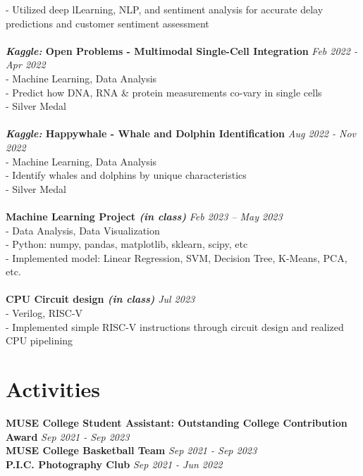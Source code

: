 \documentclass[a4paper,10pt]{article}
\begin{document}
- Utilized deep lLearning, NLP, and sentiment analysis for accurate delay predictions and customer sentiment assessment\\
\\
\textbf{\textit{Kaggle:} Open Problems - Multimodal Single-Cell Integration} \hfill \textit{Feb 2022 - Apr 2022}\\
- Machine Learning, Data Analysis\\
- Predict how DNA, RNA \& protein measurements co-vary in single cells\\
- Silver Medal\\
\\
\textbf{\textit{Kaggle:} Happywhale - Whale and Dolphin Identification} \hfill \textit{Aug 2022 - Nov 2022}\\
- Machine Learning, Data Analysis\\
- Identify whales and dolphins by unique characteristics\\
- Silver Medal\\
\\
\textbf{Machine Learning Project \textit{(in class)}} \hfill \textit{Feb 2023 -- May 2023}\\
- Data Analysis, Data Visualization\\
- Python: numpy, pandas, matplotlib, sklearn, scipy, etc\\
- Implemented model: Linear Regression, SVM, Decision Tree, K-Means, PCA, etc.\\
\\
\textbf{CPU Circuit design \textit{(in class)}} \hfill \textit{Jul 2023}\\
- Verilog, RISC-V\\
- Implemented simple RISC-V instructions through circuit design and realized CPU pipelining

\section*{Activities}
\textbf{MUSE College Student Assistant: Outstanding College Contribution Award} \hfill \textit{Sep 2021 - Sep 2023}\\
\textbf{MUSE College Basketball Team} \hfill \textit{Sep 2021 - Sep 2023}\\
\textbf{P.I.C. Photography Club} \hfill \textit{Sep 2021 - Jun 2022}
\end{document}
